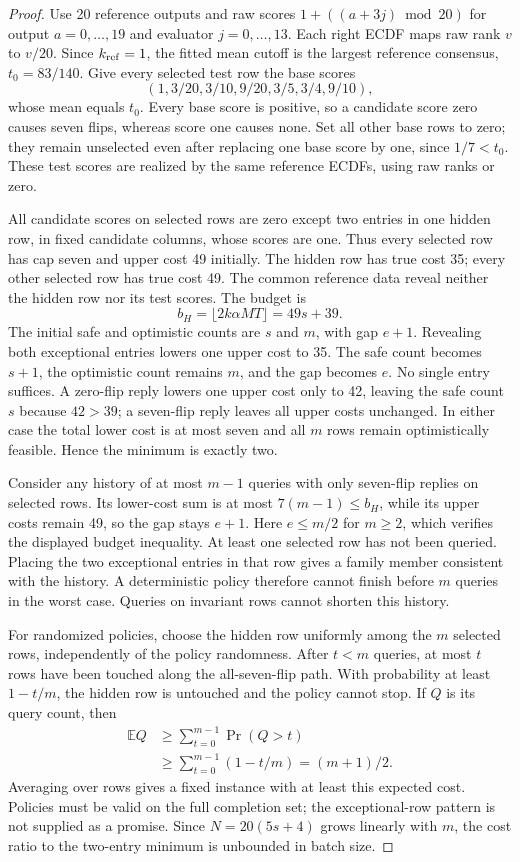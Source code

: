 \begin{proof}
Use 20 reference outputs and raw scores $1+((a+3j)\bmod20)$ for output $a=0,\ldots,19$ and evaluator $j=0,\ldots,13$. Each right ECDF maps raw rank $v$ to $v/20$. Since $k_{\rm ref}=1$, the fitted mean cutoff is the largest reference consensus, $t_0=83/140$. Give every selected test row the base scores
\[
 (1,3/20,3/10,9/20,3/5,3/4,9/10),
\]
whose mean equals $t_0$. Every base score is positive, so a candidate score zero causes seven flips, whereas score one causes none. Set all other base rows to zero; they remain unselected even after replacing one base score by one, since $1/7<t_0$. These test scores are realized by the same reference ECDFs, using raw ranks or zero.

All candidate scores on selected rows are zero except two entries in one hidden row, in fixed candidate columns, whose scores are one. Thus every selected row has cap seven and upper cost 49 initially. The hidden row has true cost 35; every other selected row has true cost 49. The common reference data reveal neither the hidden row nor its test scores. The budget is
\[
 b_H=\lfloor 2k\alpha MT\rfloor=49s+39.
\]
The initial safe and optimistic counts are $s$ and $m$, with gap $e+1$. Revealing both exceptional entries lowers one upper cost to 35. The safe count becomes $s+1$, the optimistic count remains $m$, and the gap becomes $e$. No single entry suffices. A zero-flip reply lowers one upper cost only to 42, leaving the safe count $s$ because $42>39$; a seven-flip reply leaves all upper costs unchanged. In either case the total lower cost is at most seven and all $m$ rows remain optimistically feasible. Hence the minimum is exactly two.

Consider any history of at most $m-1$ queries with only seven-flip replies on selected rows. Its lower-cost sum is at most $7(m-1)\le b_H$, while its upper costs remain 49, so the gap stays $e+1$. Here $e\le m/2$ for $m\ge2$, which verifies the displayed budget inequality. At least one selected row has not been queried. Placing the two exceptional entries in that row gives a family member consistent with the history. A deterministic policy therefore cannot finish before $m$ queries in the worst case. Queries on invariant rows cannot shorten this history.

For randomized policies, choose the hidden row uniformly among the $m$ selected rows, independently of the policy randomness. After $t<m$ queries, at most $t$ rows have been touched along the all-seven-flip path. With probability at least $1-t/m$, the hidden row is untouched and the policy cannot stop. If $Q$ is its query count, then
\[
 \begin{aligned}
 \mathbb E Q&\ge\sum_{t=0}^{m-1}\Pr(Q>t)\\
 &\ge\sum_{t=0}^{m-1}(1-t/m)=(m+1)/2.
 \end{aligned}
\]
Averaging over rows gives a fixed instance with at least this expected cost. Policies must be valid on the full completion set; the exceptional-row pattern is not supplied as a promise. Since $N=20(5s+4)$ grows linearly with $m$, the cost ratio to the two-entry minimum is unbounded in batch size.
\end{proof}

